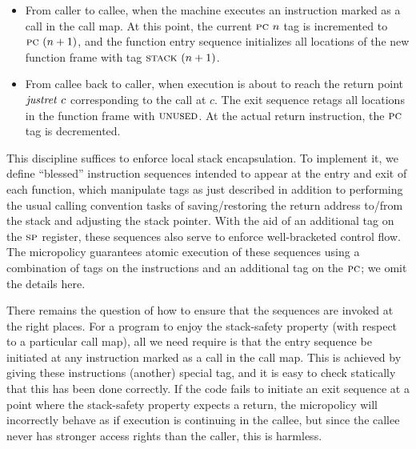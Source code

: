 \documentclass[acmsmall,review,anonymous]{acmart}\settopmatter{printfolios=true,printccs=false,printacmref=false}
\begin{document}
{\begin{itemize}

\item From caller to callee, when the machine executes an instruction marked as a call in
  the call map.
  At this point, the current
  $\textsc{pc} ~ n$ tag is incremented to $\textsc{pc} ~ (n + 1)$, and the function
  entry sequence initializes  all locations of the new function frame with
  tag $\textsc{stack} ~ (n + 1)$.

\item From callee back to caller, when execution is about to reach the return point
  $\mathit{justret}\ c$
  corresponding to the call at $c$.  The exit sequence retags all locations in the function
  frame with $\textsc{unused}$. At the actual return instruction, the
  $\textsc{pc}$ tag is decremented.

\end{itemize}

This discipline suffices to enforce local stack encapsulation.
To implement it,  we define ``blessed'' instruction sequences
intended to appear at the entry and exit of each function,
which manipulate tags as just described in addition to performing the
usual calling convention tasks of saving/restoring the return address to/from
the stack and adjusting the stack pointer. With the aid of an additional tag on
the $\textsc{sp}$ register, these sequences also serve to enforce
well-bracketed control flow.
The micropolicy guarantees atomic execution of these sequences
using a combination of tags on the instructions
and an additional tag on the $\textsc{pc}$; we omit the details here.

There remains the question of how to ensure that the sequences are
invoked at the right places. For a program to enjoy the stack-safety property
(with respect to a particular call map), all we need require is that
the entry sequence be initiated at any instruction marked as a call
in the call map. This is achieved by giving these instructions (another) special tag,
and it is easy to check statically that this has been done correctly.
If the code fails to initiate an exit
sequence at a point where the stack-safety property expects a return,
the micropolicy will incorrectly behave as if execution
is continuing in the callee, but since the callee never has stronger access
rights than the caller, this is harmless.


}
\end{document}
